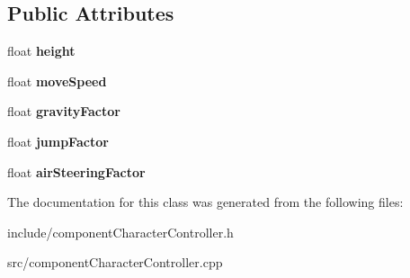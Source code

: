 \subsection*{\-Public \-Attributes}
\begin{DoxyCompactItemize}
\item 
\hypertarget{classComponentTemplateCharacterController_aa4b3a2894bfacef174aa0ea7a238e5e7}{
float {\bfseries height}}
\label{d5/d37/classComponentTemplateCharacterController_aa4b3a2894bfacef174aa0ea7a238e5e7}

\item 
\hypertarget{classComponentTemplateCharacterController_a4a47991600e0510b8c879d85d93095c0}{
float {\bfseries move\-Speed}}
\label{d5/d37/classComponentTemplateCharacterController_a4a47991600e0510b8c879d85d93095c0}

\item 
\hypertarget{classComponentTemplateCharacterController_a9ca8e469ec056be583832f3ee066c36c}{
float {\bfseries gravity\-Factor}}
\label{d5/d37/classComponentTemplateCharacterController_a9ca8e469ec056be583832f3ee066c36c}

\item 
\hypertarget{classComponentTemplateCharacterController_a52aa00b92fa64ceb09dac797a1c83a14}{
float {\bfseries jump\-Factor}}
\label{d5/d37/classComponentTemplateCharacterController_a52aa00b92fa64ceb09dac797a1c83a14}

\item 
\hypertarget{classComponentTemplateCharacterController_a7ca15dccbd8482dba6f12c9d5cb53bc1}{
float {\bfseries air\-Steering\-Factor}}
\label{d5/d37/classComponentTemplateCharacterController_a7ca15dccbd8482dba6f12c9d5cb53bc1}

\end{DoxyCompactItemize}


\-The documentation for this class was generated from the following files\-:\begin{DoxyCompactItemize}
\item 
include/component\-Character\-Controller.\-h\item 
src/component\-Character\-Controller.\-cpp\end{DoxyCompactItemize}
